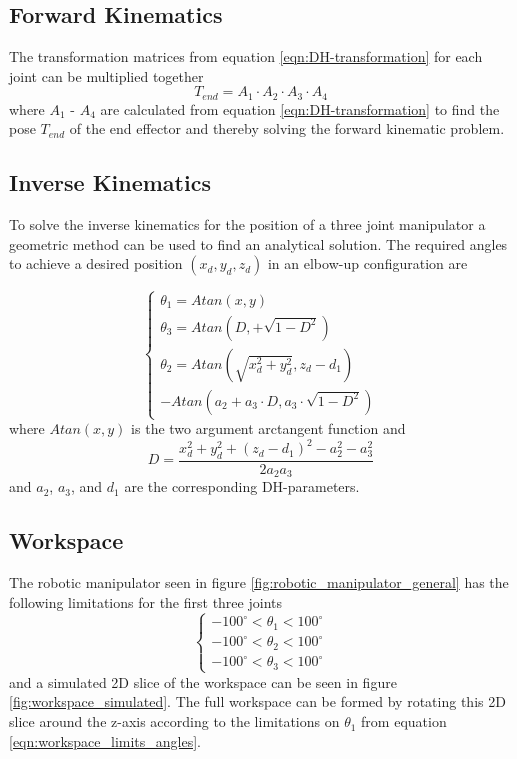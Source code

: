 \subsection*{Forward Kinematics}
The transformation matrices from equation \ref{eqn:DH-transformation} for each joint can be multiplied together
\begin{equation}
    T_{end} = A_1 \cdot A_2 \cdot A_3 \cdot A_4
\end{equation}
where \(A_1\) - \(A_4\) are calculated from equation \ref{eqn:DH-transformation} to find the pose \(T_{end}\) of the end effector and thereby solving the forward kinematic problem.


\subsection*{Inverse Kinematics}
To solve the inverse kinematics for the position of a three joint manipulator a geometric method can be used to find an analytical solution. The required angles to achieve a desired position \((x_d, y_d, z_d)\) in an elbow-up configuration are \cite{Lec14_mit_Manipulation}

\begin{equation}
    \begin{cases}
        \theta_1 = Atan(x, y) \\
        \theta_3 = Atan(D, +\sqrt{1 - D^2}) \\
        \theta_2 = Atan(\sqrt{x_d^2 + y_d^2}, z_d - d_1) \\- Atan(a_2 + a_3 \cdot D, a_3 \cdot \sqrt{1 - D^2}) %
    \end{cases}
\end{equation}
where \(Atan(x, y)\) is the two argument arctangent function \cite{inverse_tangent_wolfram} and 
\begin{equation}
    D = \frac{x_d^2 + y_d^2 + (z_d - d_1)^2 - a_2^2 - a_3^2}{2 a_2 a_3}
\end{equation}
and \(a_2\), \(a_3\), and \(d_1\)   are the corresponding DH-parameters.



\subsection*{Workspace}
The robotic manipulator seen in figure \ref{fig:robotic_manipulator_general} has the following limitations for the first three joints
\begin{equation}
    \begin{cases}
        -100^\circ < \theta_1 < 100^\circ \\
        -100^\circ < \theta_2 < 100^\circ \\
        -100^\circ < \theta_3 < 100^\circ 
    \end{cases}
    \label{eqn:workspace_limits_angles}
\end{equation}
and a simulated 2D slice of the workspace can be seen in figure \ref{fig:workspace_simulated}. The full workspace can be formed by rotating this 2D slice around the z-axis according to the limitations on \(\theta_1\) from equation \ref{eqn:workspace_limits_angles}.


